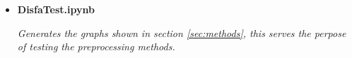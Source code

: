 {\begin{itemize}
\begin{itemize}
\begin{figure}[!h]
                    \caption{L2 reg graph}
                    \label{fig:viewresult}
                    \end{figure}
                  \item {\bf DisfaTest.ipynb }
                  \begin{sloppypar} \textit{Generates the graphs shown in section \ref{sec:methods}, this serves the perpose of
                    testing the preprocessing methods.}\end{sloppypar}
                \end{itemize}

      \end{itemize}
      }
